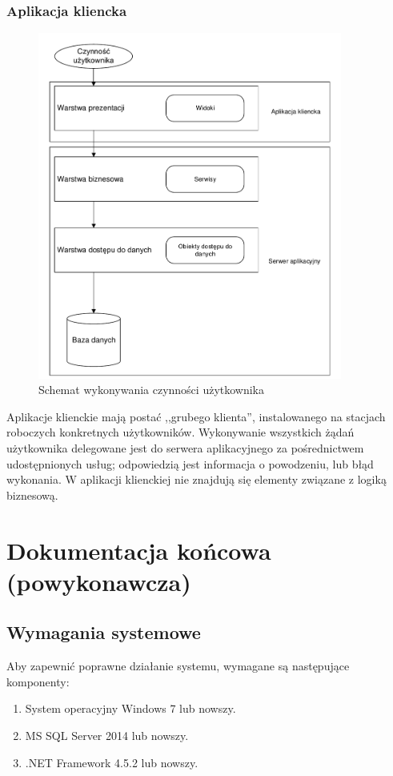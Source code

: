 \documentclass[10pt,a4paper]{article}
\begin{document}
\subsubsection{Aplikacja kliencka}
\begin{figure}[H]
	\centering
	\includegraphics[width=10cm]{architecture-fat-client.pdf}
	\caption{Schemat wykonywania czynności użytkownika}
\end{figure}
Aplikacje klienckie mają postać ,,grubego klienta'', instalowanego na stacjach roboczych konkretnych użytkowników. Wykonywanie wszystkich żądań użytkownika delegowane jest do serwera aplikacyjnego za pośrednictwem udostępnionych usług; odpowiedzią jest informacja o powodzeniu, lub błąd wykonania. W aplikacji klienckiej nie znajdują się elementy związane z logiką biznesową.

\newpage
\section{Dokumentacja końcowa (powykonawcza)}

\subsection{Wymagania systemowe}
Aby zapewnić poprawne działanie systemu, wymagane są następujące komponenty:
\begin{enumerate}
	\item System operacyjny Windows 7 lub nowszy.
	\item MS SQL Server 2014 lub nowszy.
	\item .NET Framework 4.5.2 lub nowszy.
\end{enumerate}
\end{document}

